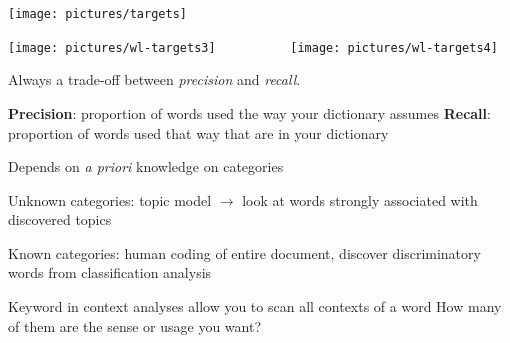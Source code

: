 \documentclass[kp]{foilpack}
\begin{document}

\begin{center}\texttt{[image: pictures/targets]}\end{center}


\begin{center}\texttt{[image: pictures/wl-targets3]}
~~~~~~~~~~\texttt{[image: pictures/wl-targets4]}\end{center}





Always a trade-off between {\it precision} and {\it recall}.

\ita
\itm \textbf{Precision}: proportion of words used the way your dictionary assumes
\itm \textbf{Recall}: proportion of words used that way that are in your dictionary
\itz

Depends on {\it a priori} knowledge on categories

\ita 

\itm Unknown categories: topic model $\rightarrow$ look at words strongly associated with discovered topics

\itm Known categories: human coding of entire document, discover discriminatory words from classification analysis 

\itm Keyword in context analyses allow you to scan all contexts of a word
\ita
\itm How many of them are the sense or usage you want?
\itz






\itz


%
%
%
%
%

%
%
%
%
%
%
%
\end{document}
